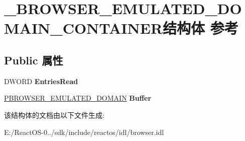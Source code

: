 \hypertarget{struct___b_r_o_w_s_e_r___e_m_u_l_a_t_e_d___d_o_m_a_i_n___c_o_n_t_a_i_n_e_r}{}\section{\+\_\+\+B\+R\+O\+W\+S\+E\+R\+\_\+\+E\+M\+U\+L\+A\+T\+E\+D\+\_\+\+D\+O\+M\+A\+I\+N\+\_\+\+C\+O\+N\+T\+A\+I\+N\+E\+R结构体 参考}
\label{struct___b_r_o_w_s_e_r___e_m_u_l_a_t_e_d___d_o_m_a_i_n___c_o_n_t_a_i_n_e_r}
\subsection*{Public 属性}
\begin{DoxyCompactItemize}
\item 
\mbox{\label{struct___b_r_o_w_s_e_r___e_m_u_l_a_t_e_d___d_o_m_a_i_n___c_o_n_t_a_i_n_e_r_a3af418301674e7376e9246536d8432a5}} 
D\+W\+O\+RD {\bfseries Entries\+Read}
\item 
\mbox{\label{struct___b_r_o_w_s_e_r___e_m_u_l_a_t_e_d___d_o_m_a_i_n___c_o_n_t_a_i_n_e_r_ac019450adf6929fd316cba9d40c029ee}} 
\hyperlink{struct___b_r_o_w_s_e_r___e_m_u_l_a_t_e_d___d_o_m_a_i_n}{P\+B\+R\+O\+W\+S\+E\+R\+\_\+\+E\+M\+U\+L\+A\+T\+E\+D\+\_\+\+D\+O\+M\+A\+IN} {\bfseries Buffer}
\end{DoxyCompactItemize}


该结构体的文档由以下文件生成\+:\begin{DoxyCompactItemize}
\item 
E\+:/\+React\+O\+S-\/0../sdk/include/reactos/idl/browser.\+idl\end{DoxyCompactItemize}
